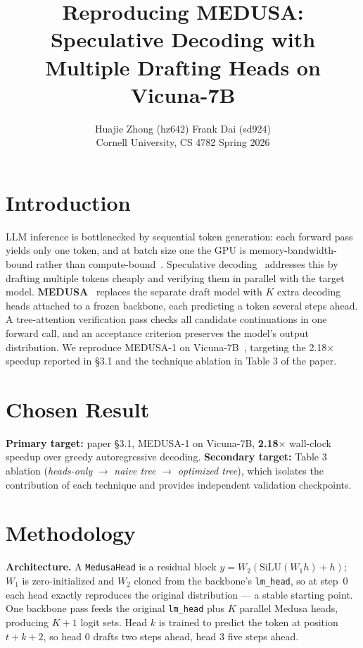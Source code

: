 \documentclass[11pt,letterpaper]{article}
\title{\vspace{-2em}\textbf{Reproducing MEDUSA:}\\[2pt]
  \large Speculative Decoding with Multiple Drafting Heads on Vicuna-7B}
\author{Huajie Zhong (hz642) \qquad Frank Dai (sd924)\\[4pt]
  \small Cornell University, CS 4782 Spring 2026}
\date{}
\begin{document}
\maketitle
\vspace{-2em}

\section{Introduction}
LLM inference is bottlenecked by sequential token generation: each forward pass yields only one token, and at batch size one the GPU is memory-bandwidth-bound rather than compute-bound~\cite{pope2022efficiently}. Speculative decoding~\cite{leviathan2023fast,chen2023accelerating} addresses this by drafting multiple tokens cheaply and verifying them in parallel with the target model. \textbf{MEDUSA}~\cite{cai2024medusa} replaces the separate draft model with $K$ extra decoding heads attached to a frozen backbone, each predicting a token several steps ahead. A tree-attention verification pass checks all candidate continuations in one forward call, and an acceptance criterion preserves the model's output distribution. We reproduce MEDUSA-1 on Vicuna-7B~\cite{vicuna2023}, targeting the 2.18$\times$ speedup reported in \S3.1 and the technique ablation in Table 3 of the paper.

\section{Chosen Result}
\textbf{Primary target:} paper \S3.1, MEDUSA-1 on Vicuna-7B, \textbf{2.18$\times$} wall-clock speedup over greedy autoregressive decoding. \textbf{Secondary target:} Table 3 ablation (\emph{heads-only} $\to$ \emph{naive tree} $\to$ \emph{optimized tree}), which isolates the contribution of each technique and provides independent validation checkpoints.

\section{Methodology}
\textbf{Architecture.} A \texttt{MedusaHead} is a residual block $y = W_2(\mathrm{SiLU}(W_1 h) + h)$; $W_1$ is zero-initialized and $W_2$ cloned from the backbone's \texttt{lm\_head}, so at step~0 each head exactly reproduces the original distribution --- a stable starting point. One backbone pass feeds the original \texttt{lm\_head} plus $K$ parallel Medusa heads, producing $K{+}1$ logit sets. Head $k$ is trained to predict the token at position $t{+}k{+}2$, so head 0 drafts two steps ahead, head 3 five steps ahead.
\end{document}
